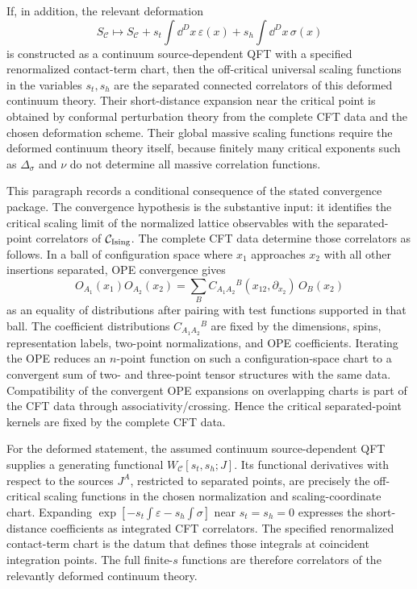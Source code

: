 If, in addition, the relevant deformation
\[
  S_{\mathcal C}
  \longmapsto
  S_{\mathcal C}
  +
  s_t\int\dd^Dx\,\varepsilon(x)
  +
  s_h\int\dd^Dx\,\sigma(x)
\]
is constructed as a continuum source-dependent QFT with a specified
renormalized contact-term chart, then the off-critical universal scaling
functions in the variables \(s_t,s_h\) are the separated connected correlators
of this deformed continuum theory.  Their short-distance expansion near the
critical point is obtained by conformal perturbation theory from the complete
CFT data and the chosen deformation scheme.  Their global massive scaling
functions require the deformed continuum theory itself, because finitely many
critical exponents such as \(\Delta_\sigma\) and \(\nu\) do not determine all
massive correlation functions.

This paragraph records a conditional consequence of the stated convergence
package.  The convergence hypothesis is the substantive input: it identifies
the critical scaling limit of the normalized lattice observables with the
separated-point correlators of
\(\mathcal C_{\rm Ising}\).  The complete CFT data determine those correlators
as follows.  In a ball of configuration space where \(x_1\) approaches \(x_2\)
with all other insertions separated, OPE convergence gives
\[
  O_{A_1}(x_1)O_{A_2}(x_2)
  =
  \sum_B
  C_{A_1A_2}{}^B(x_{12},\partial_{x_2})\,O_B(x_2)
\]
as an equality of distributions after pairing with test functions supported in
that ball.  The coefficient distributions
\(C_{A_1A_2}{}^B\) are fixed by the dimensions, spins, representation labels,
two-point normalizations, and OPE coefficients.  Iterating the OPE reduces an
\(n\)-point function on such a configuration-space chart to a convergent sum of
two- and three-point tensor structures with the same data.  Compatibility of
the convergent OPE expansions on overlapping charts is part of the CFT data
through associativity/crossing.  Hence the critical separated-point kernels are
fixed by the complete CFT data.

For the deformed statement, the assumed continuum source-dependent QFT supplies
a generating functional \(W_{\mathcal C}[s_t,s_h;J]\).  Its functional
derivatives with respect to the sources \(J^A\), restricted to separated
points, are precisely the off-critical scaling functions in the chosen
normalization and scaling-coordinate chart.  Expanding
\(\exp[-s_t\int\varepsilon-s_h\int\sigma]\) near \(s_t=s_h=0\) expresses the
short-distance coefficients as integrated CFT correlators.  The specified
renormalized contact-term chart is the datum that defines those integrals at
coincident integration points.  The full finite-\(s\) functions are therefore
correlators of the relevantly deformed continuum theory.

